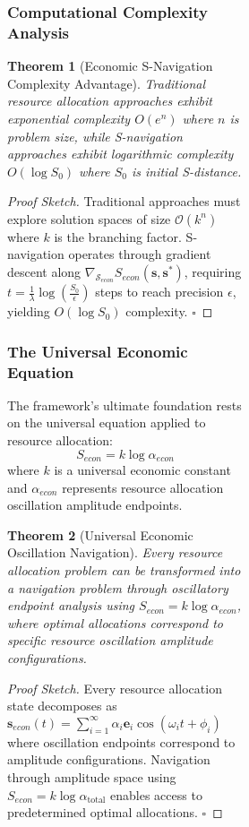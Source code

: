 \documentclass[12pt,a4paper]{article}
\newtheorem{theorem}{Theorem}
\begin{document}
\begin{figure}[H]
\begin{figure}[H]
\begin{figure}[H]
\subsubsection{Computational Complexity Analysis}

\begin{theorem}[Economic S-Navigation Complexity Advantage]
Traditional resource allocation approaches exhibit exponential complexity $O(e^n)$ where $n$ is problem size, while S-navigation approaches exhibit logarithmic complexity $O(\log S_0)$ where $S_0$ is initial S-distance.
\end{theorem}

\begin{proof}[Proof Sketch]
Traditional approaches must explore solution spaces of size $\mathcal{O}(k^n)$ where $k$ is the branching factor. S-navigation operates through gradient descent along $\nabla_{\mathcal{S}_{econ}} S_{econ}(\mathbf{s}, \mathbf{s}^*)$, requiring $t = \frac{1}{\lambda} \log(\frac{S_0}{\epsilon})$ steps to reach precision $\epsilon$, yielding $O(\log S_0)$ complexity. $\square$
\end{proof}

\subsubsection{The Universal Economic Equation}

The framework's ultimate foundation rests on the universal equation applied to resource allocation:
\begin{equation}
S_{econ} = k \log \alpha_{econ}
\end{equation}
where $k$ is a universal economic constant and $\alpha_{econ}$ represents resource allocation oscillation amplitude endpoints.

\begin{theorem}[Universal Economic Oscillation Navigation]
Every resource allocation problem can be transformed into a navigation problem through oscillatory endpoint analysis using $S_{econ} = k \log \alpha_{econ}$, where optimal allocations correspond to specific resource oscillation amplitude configurations.
\end{theorem}

\begin{proof}[Proof Sketch]
Every resource allocation state decomposes as $\mathbf{s}_{econ}(t) = \sum_{i=1}^{\infty} \alpha_i \mathbf{e}_i \cos(\omega_i t + \phi_i)$ where oscillation endpoints correspond to amplitude configurations. Navigation through amplitude space using $S_{econ} = k \log \alpha_{\text{total}}$ enables access to predetermined optimal allocations. $\square$
\end{proof}


\end{figure}
\end{figure}
\end{figure}
\end{document}

